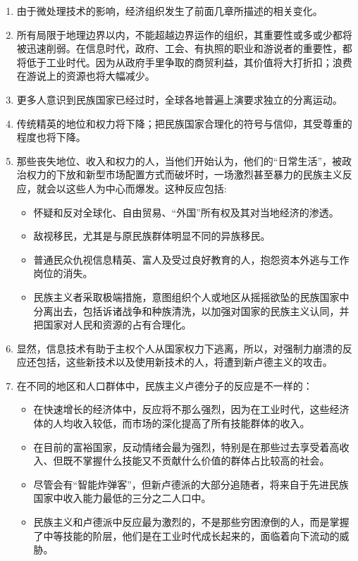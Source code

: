 \begin{enumerate}
    \item 由于微处理技术的影响，经济组织发生了前面几章所描述的相关变化。
    \item 所有局限于地理边界以内，不能超越边界运作的组织，其重要性或多或少都将被迅速削弱。在信息时代，政府、工会、有执照的职业和游说者的重要性，都将低于工业时代。因为从政府手里争取的商贸利益，其价值将大打折扣；浪费在游说上的资源也将大幅减少。
    \item 更多人意识到民族国家已经过时，全球各地普遍上演要求独立的分离运动。
    \item 传统精英的地位和权力将下降；把民族国家合理化的符号与信仰，其受尊重的程度也将下降。
    \item 那些丧失地位、收入和权力的人，当他们开始认为，他们的“日常生活”，被政治权力的下放和新型市场配置方式而破坏时，一场激烈甚至暴力的民族主义反应，就会以这些人为中心而爆发。这种反应包括:
    \begin{itemize}
        \item 怀疑和反对全球化、自由贸易、“外国”所有权及其对当地经济的渗透。
        \item 敌视移民，尤其是与原民族群体明显不同的异族移民。
        \item 普通民众仇视信息精英、富人及受过良好教育的人，抱怨资本外逃与工作岗位的消失。
        \item 民族主义者采取极端措施，意图组织个人或地区从摇摇欲坠的民族国家中分离出去，包括诉诸战争和种族清洗，以加强对国家的民族主义认同，并把国家对人民和资源的占有合理化。
    \end{itemize}
    \item 显然，信息技术有助于主权个人从国家权力下逃离，所以，对强制力崩溃的反应还包括，这些新技术以及使用新技术的人，将遭到新卢德主义的攻击。
    \item 在不同的地区和人口群体中，民族主义卢德分子的反应是不一样的：
    \begin{itemize}
        \item 在快速增长的经济体中，反应将不那么强烈，因为在工业时代，这些经济体的人均收入较低，而市场的深化提高了所有技能群体的收入。
        \item 在目前的富裕国家，反动情绪会最为强烈，特别是在那些过去享受着高收入、但既不掌握什么技能又不贡献什么价值的群体占比较高的社会。
        \item 尽管会有“智能炸弹客”，但新卢德派的大部分追随者，将来自于先进民族国家中收入能力最低的三分之二人口中。
        \item 民族主义和卢德派中反应最为激烈的，不是那些穷困潦倒的人，而是掌握了中等技能的阶层，他们是在工业时代成长起来的，面临着向下流动的威胁。

\end{itemize}
\end{enumerate}
